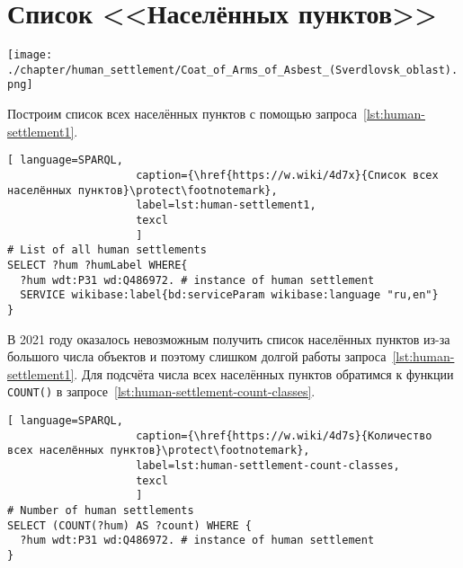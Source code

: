 \section{Список <<Населённых пунктов>>}
\begin{marginfigure}[0.0cm]
{\texttt{[image: ./chapter/human\_settlement/Coat\_of\_Arms\_of\_Asbest\_(Sverdlovsk\_oblast).png]}}
  \caption{Это герб населённого пункта России или другой страны?\newline%
См. ответ~\protect\ref{answer:flag_human_settlements} на с.~\protect\pageref{answer:flag_human_settlements}.}
  \label{fig:flag_question_human_settlements2}%
\end{marginfigure}

Построим список всех населённых пунктов с помощью запроса~\ref{lst:human-settlement1}.

\begin{lstlisting}[ language=SPARQL, 
                    caption={\href{https://w.wiki/4d7x}{Список всех населённых пунктов}\protect\footnotemark},
                    label=lst:human-settlement1,
                    texcl 
                    ]
# List of all human settlements
SELECT ?hum ?humLabel WHERE{
  ?hum wdt:P31 wd:Q486972. # instance of human settlement
  SERVICE wikibase:label{bd:serviceParam wikibase:language "ru,en"}
}
\end{lstlisting}%

В 2021 году оказалось невозможным получить список населённых пунктов 
из-за большого числа объектов и поэтому слишком долгой работы запроса~\ref{lst:human-settlement1}. 
Для подсчёта числа всех населённых пунктов обратимся к функции \lstinline|COUNT()| 
в запросе~\ref{lst:human-settlement-count-classes}.

\begin{lstlisting}[ language=SPARQL, 
                    caption={\href{https://w.wiki/4d7s}{Количество всех населённых пунктов}\protect\footnotemark},
                    label=lst:human-settlement-count-classes,
                    texcl 
                    ]
# Number of human settlements
SELECT (COUNT(?hum) AS ?count) WHERE {
  ?hum wdt:P31 wd:Q486972. # instance of human settlement  
}
\end{lstlisting}%


